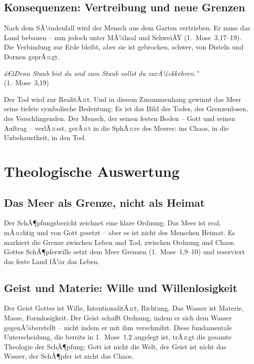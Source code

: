 ﻿\documentclass[a4paper,12pt]{article}
\theoremstyle{definition}
\begin{document}
\subsection{Konsequenzen: Vertreibung und neue Grenzen}

Nach dem SÃ¼ndenfall wird der Mensch aus dem Garten vertrieben. Er muss das Land
bebauen -- nun jedoch unter MÃ¼hsal und SchweiÃŸ (1.~Mose~3,17--19). Die Verbindung
zur Erde bleibt, aber sie ist gebrochen, schwer, von Disteln und Dornen geprÃ¤gt.

\begin{displayquote}
    \textit{â€žDenn Staub bist du und zum Staub sollst du zurÃ¼ckkehren."}\\
    \hfill (1.~Mose~3,19)
\end{displayquote}

Der Tod wird zur RealitÃ¤t. Und in diesem Zusammenhang gewinnt das Meer seine
tiefste symbolische Bedeutung: Es ist das Bild des Todes, des Grenzenlosen,
des Verschlingenden. Der Mensch, der seinen festen Boden -- Gott und seinen Auftrag
-- verlÃ¤sst, gerÃ¤t in die SphÃ¤re des Meeres: ins Chaos, in die Unbehaustheit,
in den Tod.

\section{Theologische Auswertung}

\subsection{Das Meer als Grenze, nicht als Heimat}

Der SchÃ¶pfungsbericht zeichnet eine klare Ordnung: Das Meer ist real, mÃ¤chtig
und von Gott gesetzt -- aber es ist nicht des Menschen Heimat. Es markiert die
Grenze zwischen Leben und Tod, zwischen Ordnung und Chaos. Gottes SchÃ¶pferwille
setzt dem Meer Grenzen (1.~Mose~1,9--10) und reserviert das feste Land fÃ¼r das
Leben.

\subsection{Geist und Materie: Wille und Willenlosigkeit}

Der Geist Gottes ist Wille, IntentionalitÃ¤t, Richtung. Das Wasser ist Materie,
Masse, Formlosigkeit. Der Geist schafft Ordnung, indem er sich dem Wasser
gegenÃ¼berstellt -- nicht indem er mit ihm verschmilzt. Diese fundamentale
Unterscheidung, die bereits in 1.~Mose~1,2 angelegt ist, trÃ¤gt die gesamte
Theologie der SchÃ¶pfung: Gott ist nicht die Welt, der Geist ist nicht das Wasser,
der SchÃ¶pfer ist nicht das Chaos.
\end{document}
